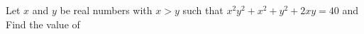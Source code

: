 Let $x$ and $y$ be real numbers with $x>y$ such that $x^2y^2+x^2+y^2+2xy=40$ and   Find the value of 